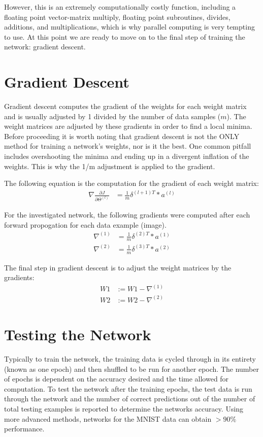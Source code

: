 \documentclass[11pt]{article}
\begin{document}
However, this is an extremely computationally costly function, including a floating point vector-matrix multiply, floating point subroutines, divides, additions, and multiplications, which is why parallel computing is very tempting to use. At this point we are ready to move on to the final step of training the network: gradient descent.

\section{Gradient Descent}
Gradient descent computes the gradient of the weights for each weight matrix and is usually adjusted by 1 divided by the number of data samples ($m$). The weight matrices are adjusted by these gradients in order to find a local minima. Before proceeding it is worth noting that gradient descent is not the ONLY method for training a network's weights, nor is it the best. One common pitfall includes overshooting the minima and ending up in a divergent inflation of the weights. This is why the 1/m adjustment is applied to the gradient.

The following equation is the computation for the gradient of each weight matrix:
\begin{align}
	\nabla\frac{\partial J}{\partial\Theta^{(l)}} & = \frac{1}{m} \delta^{(l+1)T}*a^{(l)}
\end{align}

For the investigated network, the following gradients were computed after each forward propogation for each data example (image).
\begin{align*}
	\nabla^{(1)} & = \frac{1}{m} \delta^{(2)T}*a^{(1)}\\
	\nabla^{(2)} & = \frac{1}{m} \delta^{(3)T}*a^{(2)}
\end{align*} 

The final step in gradient descent is to adjust the weight matrices by the gradients:
\begin{align*}
	W1 &:= W1 - \nabla^{(1)} \\
	W2 &:= W2 - \nabla^{(2)}
\end{align*}

\section{Testing the Network}
Typically to train the network, the training data is cycled through in its entirety (known as one epoch) and then shuffled to be run for another epoch. The number of epochs is dependent on the accuracy desired and the time allowed for computation. To test the network after the training epochs, the test data is run through the network and the number of correct predictions out of the number of total testing examples is reported to determine the networks accuracy. Using more advanced methods, networks for the MNIST data can obtain $>90\%$ performance.
\end{document}
